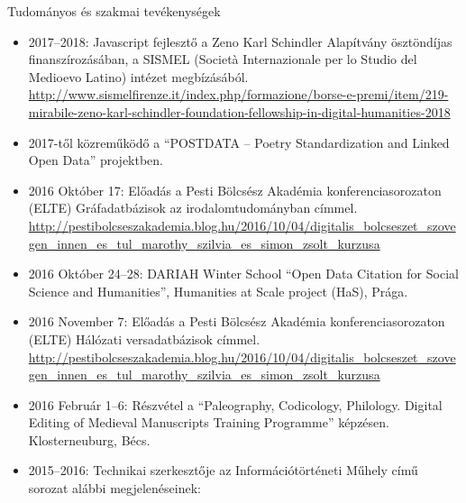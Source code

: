 \vspace{1em}

Tudományos és szakmai tevékenységek

\begin{itemize}
  \item{ 
    2017--2018: Javascript fejlesztő a Zeno Karl Schindler Alapítvány ösztöndíjas finanszírozásában, a SISMEL (Società Internazionale per lo Studio del Medioevo Latino) intézet megbízásából. 
    \url{http://www.sismelfirenze.it/index.php/formazione/borse-e-premi/item/219-mirabile-zeno-karl-schindler-foundation-fellowship-in-digital-humanities-2018} 
  }
  \item{2017-től közreműködő a  ``POSTDATA – Poetry Standardization and Linked
    Open Data'' projektben. }
  \item{2016 Október 17: Előadás a Pesti Bölcsész Akadémia konferenciasorozaton (ELTE)
    Gráfadatbázisok az irodalomtudományban címmel.\\
    \url{http://pestibolcseszakademia.blog.hu/2016/10/04/digitalis\_bolcseszet\_szovegen\_innen\_es\_tul\_marothy\_szilvia\_es\_simon\_zsolt\_kurzusa}
  }
  \item{2016 Október 24–28: DARIAH Winter School ``Open Data
    Citation for Social Science and Humanities'', Humanities at Scale project (HaS),
    Prága. }
  \item{2016 November 7: Előadás a Pesti Bölcsész Akadémia konferenciasorozaton (ELTE) Hálózati versadatbázisok címmel.\\
    \url{http://pestibolcseszakademia.blog.hu/2016/10/04/digitalis\_bolcseszet\_szovegen\_innen\_es\_tul\_marothy\_szilvia\_es\_simon\_zsolt\_kurzusa}
        }
  \item{2016 Február 1–6: Részvétel a ``Paleography, Codicology, Philology.
       Digital Editing of Medieval Manuscripts Training Programme'' képzésen.
       Klosterneuburg, Bécs. }
  \item{2015–2016: Technikai szerkesztője az Információtörténeti Műhely című sorozat alábbi megjelenéseinek: }
\end{itemize}
